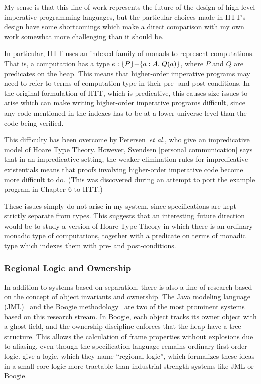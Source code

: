 My sense is that this line of work represents the future of the design
of high-level imperative programming languages, but the particular
choices made in HTT's design have some shortcomings which make a
direct comparison with my own work somewhat more challenging than it
should be.

In particular, HTT uses an indexed family of monads to represent
computations.  That is, a computation has a type $e :
\{{P}\}{-}\{{a:A}.\;{Q(a)}\}$, where $P$ and $Q$ are predicates on the
heap. This means that higher-order imperative programs may need to
refer to terms of computation type in their pre- and post-conditions.
In the original formulation of HTT, which is predicative, this causes
size issues to arise which can make writing higher-order imperative
programs difficult, since any code mentioned in the indexes has to be
at a lower universe level than the code being verified.

This difficulty has been overcome by Petersen~\emph{et al.}, who give
an impredicative model of Hoare Type Theory. However, Svendsen
[personal communication] says that in an impredicative setting, the
weaker elimination rules for impredicative existentials means that
proofs involving higher-order imperative code become more difficult to
do. (This was discovered during an attempt to port the example program
in Chapter 6 to HTT.)

These issues simply do not arise in my system, since specifications
are kept strictly separate from types. This suggests that an
interesting future direction would be to study a version of Hoare Type
Theory in which there is an ordinary monadic type of computations,
together with a predicate on terms of monadic type which indexes them
with pre- and post-conditions.

\subsubsection{Regional Logic and Ownership}

In addition to systems based on separation, there is also a line of
research based on the concept of object invariants and ownership.  The
Java modeling language (JML)~\cite{jml} and the Boogie
methodology~\cite{boogie} are two of the most prominent systems based
on this research stream. In Boogie, each object tracks its owner
object with a ghost field, and the ownership discipline enforces that
the heap have a tree structure. This allows the calculation of frame
properties without explosions due to aliasing, even though the
specification language remains ordinary first-order
logic. \citet{banerjee-naumann-regions} give a logic, which they name
``regional logic'', which formalizes these ideas in a small core logic
more tractable than industrial-strength systems like JML or Boogie.

